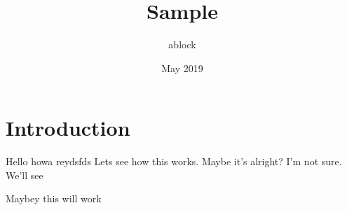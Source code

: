 \documentclass{article}
\title{Sample}
\author{ablock }
\date{May 2019}
\begin{document}
\maketitle

\section{Introduction}
Hello howa reydsfds Lets see how this works. Maybe it's alright? I'm not sure. We'll see

Maybey this will work 


\end{document}
